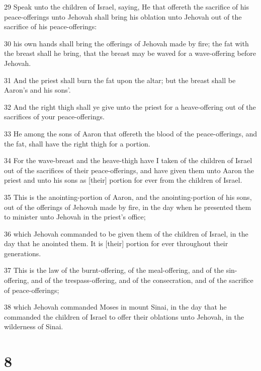 \par 29 Speak unto the children of Israel, saying, He that offereth the sacrifice of his peace-offerings unto Jehovah shall bring his oblation unto Jehovah out of the sacrifice of his peace-offerings:
\par 30 his own hands shall bring the offerings of Jehovah made by fire; the fat with the breast shall he bring, that the breast may be waved for a wave-offering before Jehovah.
\par 31 And the priest shall burn the fat upon the altar; but the breast shall be Aaron's and his sons'.
\par 32 And the right thigh shall ye give unto the priest for a heave-offering out of the sacrifices of your peace-offerings.
\par 33 He among the sons of Aaron that offereth the blood of the peace-offerings, and the fat, shall have the right thigh for a portion.
\par 34 For the wave-breast and the heave-thigh have I taken of the children of Israel out of the sacrifices of their peace-offerings, and have given them unto Aaron the priest and unto his sons as [their] portion for ever from the children of Israel.
\par 35 This is the anointing-portion of Aaron, and the anointing-portion of his sons, out of the offerings of Jehovah made by fire, in the day when he presented them to minister unto Jehovah in the priest's office;
\par 36 which Jehovah commanded to be given them of the children of Israel, in the day that he anointed them. It is [their] portion for ever throughout their generations.
\par 37 This is the law of the burnt-offering, of the meal-offering, and of the sin-offering, and of the trespass-offering, and of the consecration, and of the sacrifice of peace-offerings;
\par 38 which Jehovah commanded Moses in mount Sinai, in the day that he commanded the children of Israel to offer their oblations unto Jehovah, in the wilderness of Sinai.

\chapter{8}

